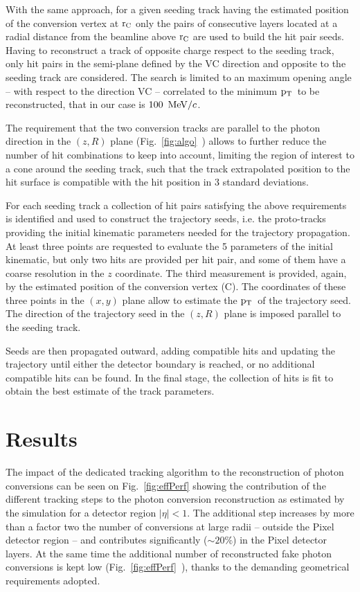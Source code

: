 \documentclass[a4paper]{jpconf}
\def \pt{$\p_{\rm T}$~}
\begin{document}
With the same approach, for a given seeding track  having  the estimated position of the conversion vertex at  $\rm r_C$ only the pairs of consecutive layers located at a radial distance from the beamline above $\rm r_C$ are used to build the hit pair seeds. 
%
Having to reconstruct a track of opposite charge respect to the seeding track, only hit pairs in the semi-plane defined by the VC direction and opposite to the seeding track are considered. The search is limited to an maximum opening angle -- with respect to the direction VC -- correlated to the minimum \pt to be reconstructed, that in our case is $100~{\rm \, MeV}/c$.

The requirement that the two conversion tracks are parallel to the photon direction in the $(z,R)$ plane (Fig.~\ref{fig:algo}~) allows to further   reduce the number of hit combinations to keep into account, limiting the region of interest to a cone around the seeding track, such that the track extrapolated position to the hit surface is compatible with the hit position in 3 standard deviations.  


For each seeding track a collection of hit pairs satisfying the above requirements  is identified and used to construct the trajectory seeds, i.e. the proto-tracks providing the initial kinematic parameters needed for the trajectory propagation.
At least three points are requested to evaluate the 5 parameters of the initial kinematic, but only two hits are provided per hit pair, and some of them have a coarse resolution in the $z$ coordinate. The third measurement is provided, again, by the   estimated position of the conversion vertex (C). The coordinates of these three points in the $(x,y)$ plane allow to estimate the \pt of the trajectory seed. The direction of the trajectory seed in the $(z,R)$ plane is imposed parallel to the seeding track.

Seeds are then
propagated outward, adding compatible hits and updating the trajectory
until either the detector boundary is reached, or no additional
compatible hits can be found.  In the final stage, the collection of
hits is fit to obtain the best estimate of the track parameters.

\section{Results}

The impact of the dedicated tracking algorithm  to the reconstruction of photon conversions
 can be seen on Fig.~\ref{fig:effPerf} 
showing the contribution of the different tracking steps to the photon conversion
reconstruction as estimated by the simulation  for a detector region  $|\eta|<1$.
The additional step increases by more than a factor two the number of conversions at large radii -- outside the Pixel detector region -- and contributes significantly ($\sim 20\%$) in the Pixel detector layers. 
 At the same time the additional number of reconstructed fake photon conversions is kept low (Fig.~\ref{fig:effPerf}~), thanks to the demanding geometrical requirements adopted.
 
\end{document}
